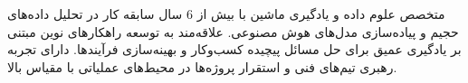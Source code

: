 \par{
    متخصص علوم داده و یادگیری ماشین با بیش از 6 سال سابقه کار در تحلیل داده‌های حجیم و پیاده‌سازی مدل‌های هوش مصنوعی. علاقه‌مند به توسعه راهکارهای نوین مبتنی بر یادگیری عمیق  برای حل مسائل پیچیده کسب‌وکار و بهینه‌سازی فرآیندها. دارای تجربه رهبری تیم‌های فنی و استقرار پروژه‌ها در محیط‌های عملیاتی با مقیاس بالا.
} 
